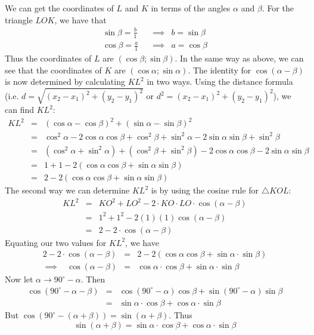 We can get the coordinates of $L$ and $K$ in terms of the angles $\alpha$ and $\beta$.
For the triangle $LOK$, we have that
\begin{eqnarray*}
\sin\beta =\frac{b}{1} \ \ \ \ &\implies& b=\sin\beta\\
\cos\beta=\frac{a}{1} \ \ \ \ &\implies&a=\cos\beta
\end{eqnarray*}
Thus the coordinates of $L$ are $(\cos\beta;\sin\beta)$. In the same way as above, we can see that the coordinates of $K$ are $(\cos\alpha;\sin\alpha)$.
The identity for $\cos(\alpha-\beta)$ is now determined by calculating $KL^2$ in two ways. Using the distance formula (i.e. $d=\sqrt{(x_2-x_1)^2+(y_2-y_1)^2}$ or $d^2=(x_2-x_1)^2+(y_2-y_1)^2$), we can find $KL^2$:
\begin{eqnarray*}
KL^2&=&(\cos\alpha-\cos\beta)^2+(\sin\alpha-\sin\beta)^2\\
&=&\cos^2\alpha-2\cos\alpha\cos\beta+\cos^2\beta+\sin^2\alpha-2\sin\alpha\sin\beta+\sin^2\beta\\
&=&(\cos^2\alpha+\sin^2\alpha)+(\cos^2\beta+\sin^2\beta)-2\cos\alpha\cos\beta-2\sin\alpha\sin\beta\\
&=&1+1-2(\cos\alpha\cos\beta+\sin\alpha\sin\beta)\\
&=&2-2(\cos\alpha\cos\beta+\sin\alpha\sin\beta)
\end{eqnarray*} 
The second way we can determine $KL^2$ is by using the cosine rule for $\triangle KOL$:
\begin{eqnarray*}
KL^2&=&KO^2+LO^2-2\cdot KO\cdot LO\cdot\cos(\alpha-\beta)\\
&=&1^2+1^2-2(1)(1)\cos(\alpha-\beta)\\
&=&2-2\cdot\cos(\alpha-\beta)
\end{eqnarray*}
Equating our two values for $KL^2$, we have
\begin{eqnarray*}
2-2\cdot\cos(\alpha-\beta)&=&2-2(\cos\alpha\cos\beta+\sin\alpha\cdot\sin\beta)\\
\implies \ \ \ \ \cos(\alpha-\beta)&=&\cos\alpha\cdot\cos\beta+\sin\alpha\cdot\sin\beta
\end{eqnarray*}
Now let $\alpha\to 90^\circ -\alpha$. Then 
\begin{eqnarray*}
\cos(90^\circ-\alpha-\beta)&=&\cos(90^\circ-\alpha)\cos\beta+\sin(90^\circ-\alpha)\sin\beta\\
&=&\sin\alpha\cdot\cos\beta+\cos\alpha\cdot\sin\beta
\end{eqnarray*}
But $\cos(90^\circ-(\alpha+\beta))=\sin(\alpha+\beta)$. Thus 
$$\sin(\alpha+\beta)=\sin\alpha\cdot\cos\beta+\cos\alpha\cdot\sin\beta$$


